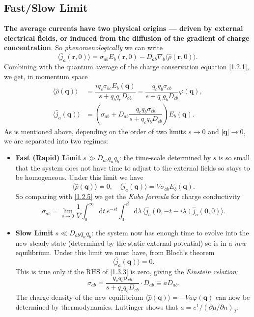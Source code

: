 \documentclass[10pt,nofootinbib,letterpaper]{revtex4}
\newcommand*\dd{\mathop{}\!\mathrm{d}}
\begin{document}
	\subsection{Fast/Slow Limit}
		\textbf{The average currents have two physical origins --- driven by external electrical fields, or induced from the diffusion of the gradient of charge concentration}. So \emph{phenomenologically} we can write
		\begin{equation}\label{1.3.1}
			\langle\hat j_a(\bm{r},0)\rangle=\sigma_{ab}E_b(\bm{r},0)-D_{ab}\nabla_b \langle\hat \rho(\bm{r},0)\rangle.
		\end{equation}
		Combining with the quantum average of the charge conservation equation \eqref{1.2.1}, we get, in momentum space
		\begin{align}
			\langle\hat\rho(\bm{q})\rangle&=\dfrac{iq_c\sigma_{bc}E_b(\bm{q})}{s+q_bq_cD_{cb}}=\dfrac{q_c q_b\sigma_{cb}}{s+q_c q_bD_{cb}}\varphi(\bm{q}),\label{1.3.2}\\
			\langle\hat j_a(\bm{q})\rangle&=\left(\sigma_{ab}+D_{ab}\dfrac{q_cq_b\sigma_{cb}}{s+q_c q_bD_{cb}}\right)E_b(\bm{q}).\label{1.3.3}
		\end{align}
		As is mentioned above, depending on the order of two limits $s\rightarrow0$ and $|\bm{q}|\rightarrow0$, we are separated into two regimes:
		\begin{itemize}
			\item {\color{red}\textbf{Fast (Rapid) Limit} $s\gg D_{ab}q_aq_b$: the time-scale determined by $s$ is so small that the system does not have time to adjust to the external fields so stays to be homogeneous}. Under this limit we have
			\begin{equation*}
				\langle\hat\rho(\bm{q})\rangle=0,\quad \langle\hat{j}_a(\bm{q})\rangle=V\sigma_{ab}E_b(\bm{q}).
			\end{equation*}
			So comparing with \eqref{1.2.5} we get the \emph{Kubo formula} for charge conductivity
			\begin{equation}\label{1.3.4}
				\sigma_{ab}=\lim_{s\rightarrow0}\dfrac{1}{V}\int_0^\infty\dd t\,e^{-st}\int_0^\beta\dd\lambda\,\langle \hat{j}_b(\bm{0},-t-i\lambda)\hat{j}_a(\bm{0},0)\rangle.
			\end{equation}
			\item {\color{red}\textbf{Slow Limit} $s\ll D_{ab}q_aq_b$: the system now has enough time to evolve into the new steady state (determined by the static external potential) so is in a \emph{new} equilibrium}. Under this limit we must have, from Bloch's theorem
			\begin{equation*}
				\langle\hat{j}_a(\bm{q})\rangle=0.
			\end{equation*}
			This is true only if the RHS of \eqref{1.3.3} is zero, giving the \emph{Einstein relation}:
			\begin{equation}\label{1.3.5}
				\sigma_{ab}=\dfrac{q_cq_b\sigma_{cb}}{s+q_cq_bD_{cb}}\cdot D_{ab}\equiv aD_{ab}.
			\end{equation}
			The charge density of the new equilibrium $\langle\hat{\rho}(\bm{q})\rangle=-Va\varphi(\bm{q})$ can now be determined by thermodynamics. Luttinger shows that $a=e^1/(\partial\mu/\partial n)_T$.
		\end{itemize}
\end{document}
